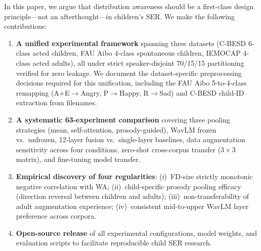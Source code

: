 In this paper, we argue that distribution awareness should be a first-class
design principle---not an afterthought---in children's SER. We make the
following contributions:

\begin{enumerate}
\item \textbf{A unified experimental framework} spanning three datasets
  (C-BESD 6-class acted children, FAU Aibo 4-class spontaneous children,
  IEMOCAP 4-class acted adults), all under strict speaker-disjoint 70/15/15
  partitioning verified for zero leakage. We document the dataset-specific
  preprocessing decisions required for this unification, including the FAU
  Aibo 5-to-4-class remapping (A+E$\rightarrow$Angry, P$\rightarrow$Happy,
  R$\rightarrow$Sad) and C-BESD child-ID extraction from filenames.

\item \textbf{A systematic 63-experiment comparison} covering three pooling
  strategies (mean, self-attention, prosody-guided), WavLM frozen vs.\
  unfrozen, 12-layer fusion vs.\ single-layer baselines, data augmentation
  sensitivity across four conditions, zero-shot cross-corpus transfer
  ($3\times3$ matrix), and fine-tuning model transfer.

\item \textbf{Empirical discovery of four regularities}:
  (i)~FD-size strictly monotonic negative correlation with WA;
  (ii)~child-specific prosody pooling efficacy (direction reversal between
  children and adults); (iii)~non-transferability of adult augmentation
  experience; (iv)~consistent mid-to-upper WavLM layer preference across
  corpora.

\item \textbf{Open-source release} of all experimental configurations, model
  weights, and evaluation scripts to facilitate reproducible child SER
  research.
\end{enumerate}
